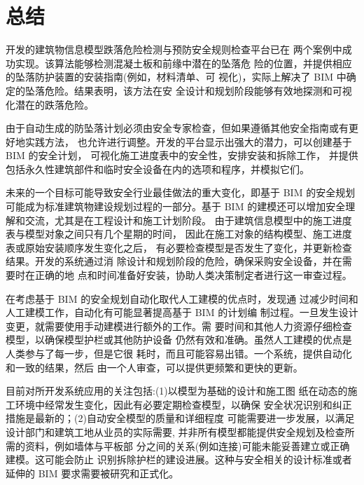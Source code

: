 \section{总结}
开发的建筑物信息模型跌落危险检测与预防安全规则检查平台已在
两个案例中成功实现。该算法能够检测混凝土板和前缘中潜在的坠落危
险的位置，并提供相应的坠落防护装置的安装指南(例如，材料清单、可
视化)，实际上解决了 BIM 中确定的坠落危险。结果表明，该方法在安
全设计和规划阶段能够有效地探测和可视化潜在的跌落危险。

由于自动生成的防坠落计划必须由安全专家检查，但如果遵循其他安全指南或有更好地实践方法，
也允许进行调整。开发的平台显示出强大的潜力，可以创建基于 BIM 的安全计划，
可视化施工进度表中的安全性，安排安装和拆除工作，
并提供包括永久性建筑部件和临时安全设备在内的选项和程序，并模拟它们。

未来的一个目标可能导致安全行业最佳做法的重大变化，即基于 
BIM 的安全规划可能成为标准建筑物建设规划过程的一部分。基于 BIM 
的建模还可以增加安全理解和交流，尤其是在工程设计和施工计划阶段。
由于建筑信息模型中的施工进度表与模型对象之间只有几个星期的时间，
因此在施工对象的结构模型、施工进度表或原始安装顺序发生变化之后，
有必要检查模型是否发生了变化，并更新检查结果。开发的系统通过消
除设计和规划阶段的危险，确保采购安全设备，并在需要时在正确的地
点和时间准备好安装，协助人类决策制定者进行这一审查过程。

在考虑基于 BIM 的安全规划自动化取代人工建模的优点时，发现通
过减少时间和人工建模工作，自动化有可能显著提高基于 BIM 的计划编
制过程。一旦发生设计变更，就需要使用手动建模进行额外的工作。需
要时间和其他人力资源仔细检查模型，以确保模型护栏或其他防护设备
仍然有效和准确。虽然人工建模的优点是人类参与了每一步，但是它很
耗时，而且可能容易出错。一个系统，提供自动化和一致的结果，然后
由一个人审查，可以提供更频繁和更快的更新。

目前对所开发系统应用的关注包括:(1)以模型为基础的设计和施工图
纸在动态的施工环境中经常发生变化，因此有必要定期检查模型，以确保
安全状况识别和纠正措施是最新的；(2)自动安全模型的质量和详细程度
可能需要进一步发展，以满足设计部门和建筑工地从业员的实际需要,
并非所有模型都能提供安全规划及检查所需的资料，例如墙体与平板部
分之间的关系(例如连接)可能未能妥善建立或正确建模。这可能会防止
识别拆除护栏的建设进展。这种与安全相关的设计标准或者延伸的 BIM
要求需要被研究和正式化。
